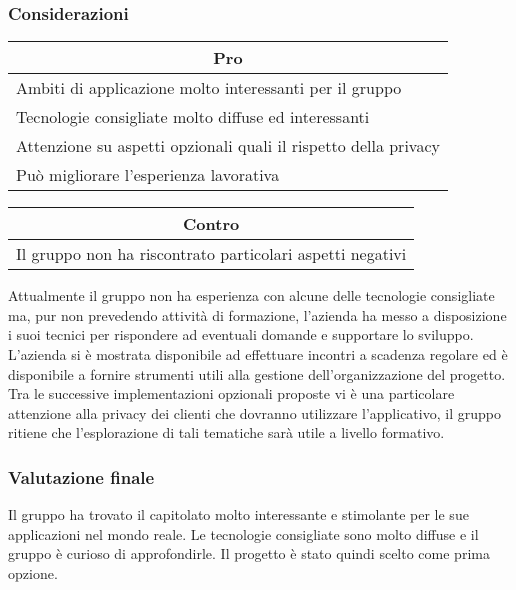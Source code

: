 \subsubsection{Considerazioni}
\begin{minipage}[t]{0.45\linewidth}
    \vspace{0pt}
    {\renewcommand{\arraystretch}{1.5}
    \begin{tabular}{p{1\linewidth}}
        \multicolumn{1}{c}{\textbf{Pro}}                        \\
        \midrule
        Ambiti di applicazione molto interessanti per il gruppo \\
        Tecnologie consigliate molto diffuse ed interessanti    \\
        Attenzione su aspetti opzionali quali il rispetto della privacy    \\
        Può migliorare l'esperienza lavorativa                  \\
        \hline
    \end{tabular}
    }
\end{minipage}
\hspace{0.05\linewidth}
\begin{minipage}[t]{0.45\linewidth}
    \vspace{0pt}
    {\renewcommand{\arraystretch}{1.5}
    \begin{tabular}{p{1\linewidth}}
        \multicolumn{1}{c}{\textbf{Contro}} \\
        \midrule
        Il gruppo non ha riscontrato particolari aspetti negativi \\
        \hline
    \end{tabular}
    }
\end{minipage}
\vspace{1em}

Attualmente il gruppo non ha esperienza con alcune delle tecnologie consigliate ma, pur non prevedendo attività di formazione, l'azienda ha messo a disposizione i suoi tecnici per rispondere ad eventuali domande e supportare lo sviluppo.
L'azienda si è mostrata disponibile ad effettuare incontri a scadenza regolare ed è disponibile a fornire strumenti utili alla gestione dell'organizzazione del progetto. 
Tra le successive implementazioni opzionali proposte vi è una particolare attenzione alla privacy dei clienti che dovranno utilizzare l'applicativo, il gruppo ritiene che l'esplorazione di tali tematiche sarà utile a livello formativo.

\subsubsection{Valutazione finale}
Il gruppo ha trovato il capitolato molto interessante e stimolante per le sue applicazioni nel mondo reale. 
Le tecnologie consigliate sono molto diffuse e il gruppo è curioso di approfondirle. 
Il progetto è stato quindi scelto come prima opzione.